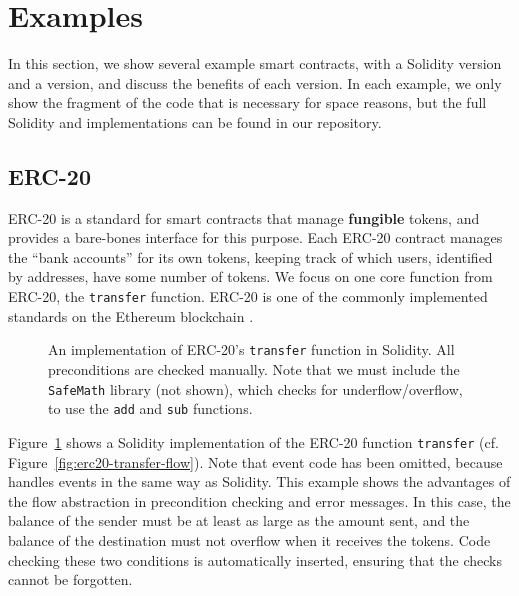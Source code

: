 \documentclass[dvipsnames, usenames, sigconf]{acmart}
\begin{document}
\section{Examples}
In this section, we show several example smart contracts, with a Solidity version and a \langName version, and discuss the benefits of each version.
In each example, we only show the fragment of the code that is necessary for space reasons, but the full Solidity and \langName implementations can be found in our repository.

\subsection{ERC-20}\label{sec:erc20-impl}
ERC-20  is a standard for smart contracts that manage \textbf{fungible} tokens, and provides a bare-bones interface for this purpose.
Each ERC-20 contract manages the ``bank accounts'' for its own tokens, keeping track of which users, identified by addresses, have some number of tokens.
We focus on one core function from ERC-20, the \lstinline{transfer} function.
ERC-20 is one of the commonly implemented standards on the Ethereum blockchain .
\begin{figure}[ht]
    \centering
    
    \caption{An implementation of ERC-20's \lstinline{transfer} function in Solidity.
        All preconditions are checked manually.
        Note that we must include the \lstinline{SafeMath} library (not shown), which checks for underflow/overflow, to use the \lstinline{add} and \lstinline{sub} functions.}
    \label{fig:erc20-transfer-sol}
\end{figure}
Figure~\ref{fig:erc20-transfer-sol} shows a Solidity implementation of the ERC-20 function \lstinline{transfer} (cf. Figure~\ref{fig:erc20-transfer-flow}).
Note that event code has been omitted, because \langName handles events in the same way as Solidity.
This example shows the advantages of the flow abstraction in precondition checking and error messages. 
In this case, the balance of the sender must be at least as large as the amount sent, and the balance of the destination must not overflow when it receives the tokens.
Code checking these two conditions is automatically inserted, ensuring that the checks cannot be forgotten.
\end{document}
